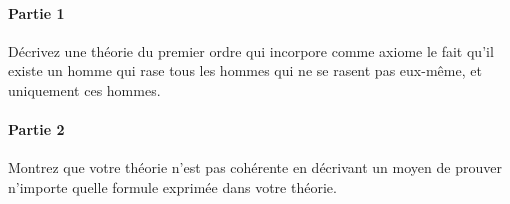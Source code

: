 \documentclass[12pt,french,a4paper]{article}
\begin{document}
\begin{question}

\paragraph{Partie 1}
Décrivez une théorie du premier ordre qui incorpore comme axiome le fait qu'il existe un homme qui rase tous les hommes qui ne se rasent pas eux-même, et uniquement ces hommes.

\paragraph{Partie 2}
Montrez que votre théorie n'est pas cohérente en décrivant un moyen de prouver n'importe quelle formule exprimée dans votre théorie.
\end{question}
\end{document}

